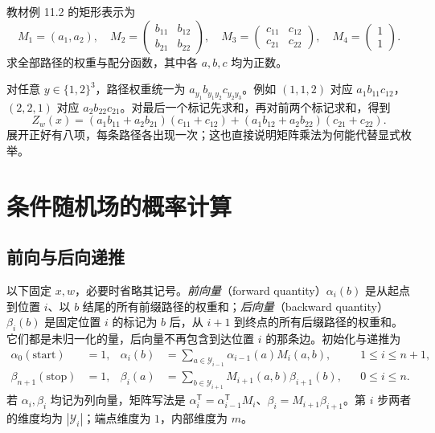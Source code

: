 \begin{example}
\label{ex:lihang-crf-symbolic-paths}
教材例 11.2 的矩形表示为
\[
  M_1=(a_1,a_2),\quad
  M_2=\begin{pmatrix}b_{11}&b_{12}\\b_{21}&b_{22}\end{pmatrix},\quad
  M_3=\begin{pmatrix}c_{11}&c_{12}\\c_{21}&c_{22}\end{pmatrix},\quad
  M_4=\begin{pmatrix}1\\1\end{pmatrix}.
\]
求全部路径的权重与配分函数，其中各 $a,b,c$ 均为正数。
\end{example}
\begin{solve}
对任意 $y\in\{1,2\}^3$，路径权重统一为 $a_{y_1}b_{y_1y_2}c_{y_2y_3}$。例如 $(1,1,2)$ 对应 $a_1b_{11}c_{12}$，$(2,2,1)$ 对应 $a_2b_{22}c_{21}$。对最后一个标记先求和，再对前两个标记求和，得到
\[
  Z_w(x)=(a_1b_{11}+a_2b_{21})(c_{11}+c_{12})
        +(a_1b_{12}+a_2b_{22})(c_{21}+c_{22}).
\]
展开正好有八项，每条路径各出现一次；这也直接说明矩阵乘法为何能代替显式枚举。
\end{solve}

\section{条件随机场的概率计算}
\label{sec:lihang-crf-probabilities}

\subsection{前向与后向递推}
\label{subsec:lihang-crf-forward-backward}

以下固定 $x,w$，必要时省略其记号。\emph{前向量}（forward quantity）$\alpha_i(b)$ 是从起点到位置 $i$、以 $b$ 结尾的所有前缀路径的权重和；\emph{后向量}（backward quantity）$\beta_i(b)$ 是固定位置 $i$ 的标记为 $b$ 后，从 $i+1$ 到终点的所有后缀路径的权重和。它们都是未归一化的量，后向量不再包含到达位置 $i$ 的那条边。初始化与递推为
\begin{align}
\label{eq:lihang-crf-forward}
  \alpha_0(\mathrm{start})&=1,&
  \alpha_i(b)&=\sum_{a\in\mathcal Y_{i-1}}\alpha_{i-1}(a)M_i(a,b),
       &&1\leq i\leq n+1,\\
\label{eq:lihang-crf-backward}
  \beta_{n+1}(\mathrm{stop})&=1,&
  \beta_i(a)&=\sum_{b\in\mathcal Y_{i+1}}M_{i+1}(a,b)\beta_{i+1}(b),
       &&0\leq i\leq n.
\end{align}
若 $\alpha_i,\beta_i$ 均记为列向量，矩阵写法是 $\alpha_i^{\mathsf T}=\alpha_{i-1}^{\mathsf T}M_i$、$\beta_i=M_{i+1}\beta_{i+1}$。第 $i$ 步两者的维度均为 $|\mathcal Y_i|$；端点维度为 $1$，内部维度为 $m$。

